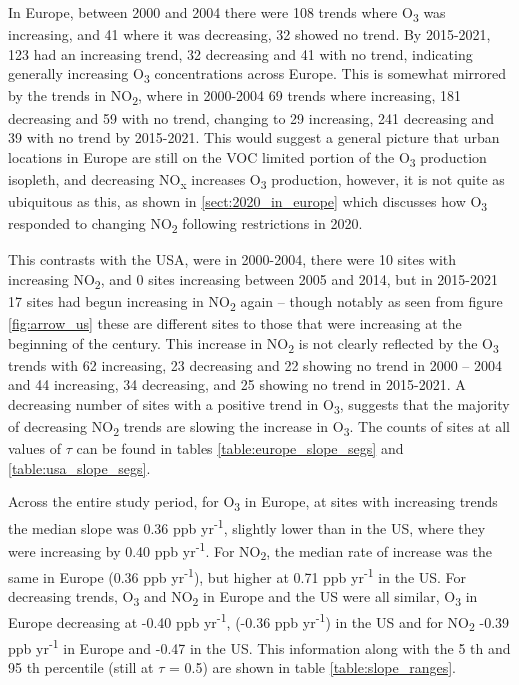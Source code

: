 \documentclass[journal abbreviation, manuscript]{copernicus}
\begin{document}
In Europe, between 2000 and 2004 there were 108 trends where O\textsubscript{3} was increasing, and 41 where it was decreasing, 32 showed no trend. By 2015-2021, 123 had an increasing trend, 32 decreasing and 41 with no trend, indicating generally increasing O\textsubscript{3} concentrations across Europe. This is somewhat mirrored by the trends in NO\textsubscript{2}, where in 2000-2004 69 trends where increasing, 181 decreasing and 59 with no trend, changing to 29 increasing, 241 decreasing and 39 with no trend by 2015-2021. This would suggest a general picture that urban locations in Europe are still on the VOC limited portion of the O\textsubscript{3} production isopleth, and decreasing NO\textsubscript{x} increases O\textsubscript{3} production, however, it is not quite as ubiquitous as this, as shown in \ref{sect:2020_in_europe} which discusses how O\textsubscript{3} responded to changing NO\textsubscript{2} following restrictions in 2020. 

This contrasts with the USA, were in 2000-2004, there were 10 sites with increasing NO\textsubscript{2}, and 0 sites increasing between 2005 and 2014, but in 2015-2021 17 sites had begun increasing in NO\textsubscript{2} again – though notably as seen from figure \ref{fig:arrow_us} these are different sites to those that were increasing at the beginning of the century. This increase in NO\textsubscript{2} is not clearly reflected by the O\textsubscript{3} trends with 62 increasing, 23 decreasing and 22 showing no trend in 2000 – 2004 and 44 increasing, 34 decreasing, and 25 showing no trend in 2015-2021. A decreasing number of sites with a positive trend in O\textsubscript{3}, suggests that the majority of decreasing NO\textsubscript{2} trends are slowing the increase in O\textsubscript{3}. The counts of sites at all values of $\tau$ can be found in tables \ref{table:europe_slope_segs} and \ref{table:usa_slope_segs}. 

Across the entire study period, for O\textsubscript{3} in Europe, at sites with increasing trends the median slope was 0.36 ppb yr\textsuperscript{-1}, slightly lower than in the US, where they were increasing by 0.40 ppb yr\textsuperscript{-1}. For NO\textsubscript{2}, the median rate of increase was the same in Europe (0.36 ppb yr\textsuperscript{-1}), but higher at 0.71 ppb yr\textsuperscript{-1} in the US. For decreasing trends, O\textsubscript{3} and NO\textsubscript{2} in Europe and the US were all similar, O\textsubscript{3} in Europe decreasing at -0.40 ppb yr\textsuperscript{-1}, (-0.36 ppb yr\textsuperscript{-1}) in the US and for NO\textsubscript{2} -0.39 ppb yr\textsuperscript{-1} in Europe and -0.47 in the US. This information along with the 5 th and 95 th percentile (still at $\tau$ = 0.5) are shown in table \ref{table:slope_ranges}. 
\end{document}
